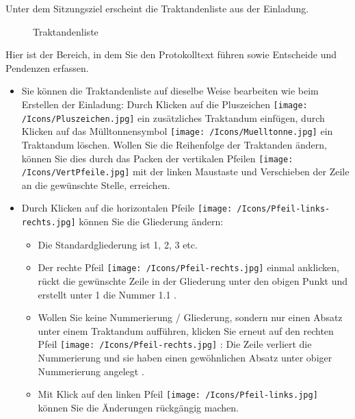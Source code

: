 Unter dem Sitzungsziel erscheint die Traktandenliste aus der Einladung.

\begin{figure}[H]
\caption{Traktandenliste}
\end{figure}

Hier ist der Bereich, in dem Sie den Protokolltext führen sowie Entscheide und Pendenzen erfassen.

\begin{itemize}
\item
Sie können die Traktandenliste auf dieselbe Weise bearbeiten wie beim Erstellen der Einladung: Durch Klicken auf die Pluszeichen \texttt{[image: /Icons/Pluszeichen.jpg]}  ein zusätzliches Traktandum einfügen, durch Klicken auf das Mülltonnensymbol \texttt{[image: /Icons/Muelltonne.jpg]}  ein Traktandum löschen. Wollen Sie die Reihenfolge der Traktanden ändern, können Sie dies durch das Packen der vertikalen Pfeilen \texttt{[image: /Icons/VertPfeile.jpg]}  mit der linken Maustaste und Verschieben der Zeile an die gewünschte Stelle, erreichen.
\item
Durch Klicken auf die horizontalen Pfeile \texttt{[image: /Icons/Pfeil-links-rechts.jpg]}  können Sie die Gliederung ändern:

	\begin{itemize}
		\item
		Die Standardgliederung ist 1, 2, 3 etc. 
		\item
		Der rechte Pfeil \texttt{[image: /Icons/Pfeil-rechts.jpg]}  einmal anklicken, rückt die gewünschte Zeile in der Gliederung unter den obigen Punkt und erstellt unter 1 die Nummer 1.1 .
		\item
		Wollen Sie keine Nummerierung / Gliederung, sondern nur einen Absatz unter einem Traktandum aufführen, klicken Sie erneut auf den rechten Pfeil \texttt{[image: /Icons/Pfeil-rechts.jpg]} : Die Zeile verliert die Nummerierung und sie haben einen gewöhnlichen Absatz unter obiger Nummerierung angelegt .
		\item
		Mit Klick auf den linken Pfeil \texttt{[image: /Icons/Pfeil-links.jpg]}  können Sie die Änderungen rückgängig machen.
	\end{itemize}
\end{itemize}

